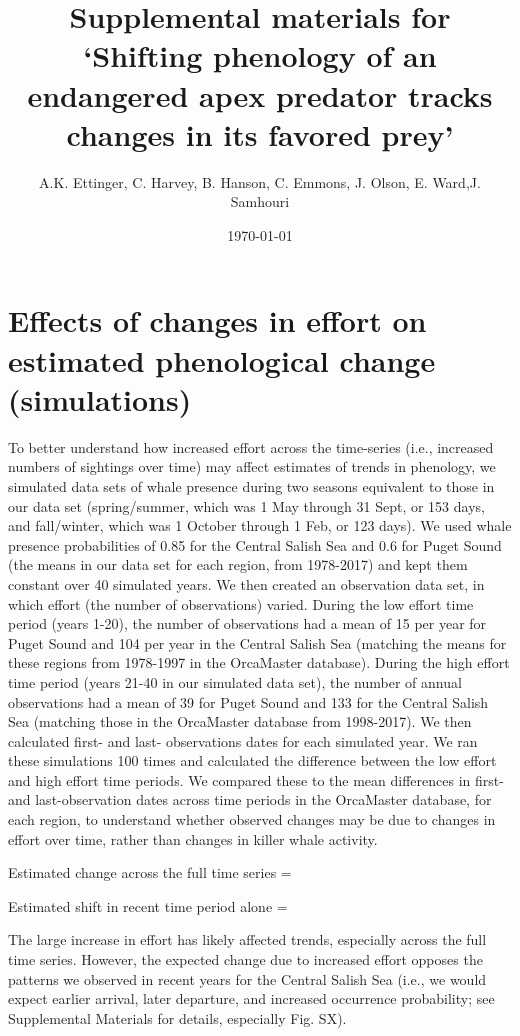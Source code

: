 \documentclass{article}
\begin{document}



\title{Supplemental materials for `Shifting phenology of an endangered apex predator tracks changes in its favored prey'}
\date{\today}
\maketitle
\author{A.K. Ettinger, C. Harvey, B. Hanson, C. Emmons, J. Olson, E. Ward,J. Samhouri}

\section* {Effects of changes in effort on estimated phenological change (simulations)}
To better understand how increased effort across the time-series (i.e., increased numbers of sightings over time) may affect estimates of trends in phenology, we simulated data sets of whale presence during two seasons equivalent to those in our data set (spring/summer, which was 1 May through 31 Sept, or 153 days, and fall/winter, which was 1 October through 1 Feb, or 123 days). We used whale presence probabilities of 0.85 for the Central Salish Sea and 0.6 for Puget Sound (the means in our data set for each region, from 1978-2017) and kept them constant over 40 simulated years. We then created an observation data set, in which effort (the number of observations) varied. During the low effort time period (years 1-20), the number of observations had a mean of 15 per year for Puget Sound and 104 per year in the Central Salish Sea (matching the means for these regions from 1978-1997 in the OrcaMaster database). During the high effort time period (years 21-40 in our simulated data set), the number of annual observations had a mean of 39 for Puget Sound and 133 for the Central Salish Sea (matching those in the OrcaMaster database from 1998-2017). We then calculated first- and last- observations dates for each simulated year. We ran these simulations 100 times and calculated the difference between the low effort and high effort time periods. We compared these to the mean differences in first- and last-observation dates across time periods in the OrcaMaster database, for each region, to understand whether observed changes may be due to changes in effort over time, rather than changes in killer whale activity. 

\par Estimated change across the full time series = 
\par Estimated shift in recent time period alone = 
\par The large increase in effort has likely affected trends, especially across the full time series.  However, the expected change due to increased effort opposes the patterns we observed in recent years for the Central Salish Sea (i.e., we would expect earlier arrival, later departure, and increased occurrence probability;  see Supplemental Materials for details, especially Fig. SX). 
\end{document}
